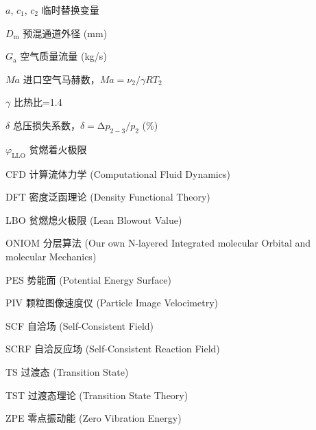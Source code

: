 
\begin{notation}
  \begin{notationlist}{2.8cm}
    \item[$a$, $c_1$, $c_2$] 临时替换变量
    \item[$D_{\text{m}}$] 预混通道外径 (mm)
    \item[$G_{\text{a}}$] 空气质量流量 (kg/s)
    \item[$\mathit{Ma}$] 进口空气马赫数，$\mathit{Ma} = \nu_2 / \gamma R T_2$
    \item[$\gamma$] 比热比=1.4
    \item[$\delta$] 总压损失系数，$\delta = \increment p_{2-3} / p_2$ (\%)
    \item[$\varphi_{\text{LLO}}$] 贫燃着火极限
    \item[CFD] 计算流体力学 (Computational Fluid Dynamics)
    \item[DFT] 密度泛函理论 (Density Functional Theory)
    \item[LBO] 贫燃熄火极限 (Lean Blowout Value)
    \item[ONIOM] 分层算法 (Our own N-layered Integrated molecular Orbital and molecular Mechanics)
    \item[PES] 势能面 (Potential Energy Surface)
    \item[PIV] 颗粒图像速度仪 (Particle Image Velocimetry)
    \item[SCF] 自洽场 (Self-Consistent Field)
    \item[SCRF] 自洽反应场 (Self-Consistent Reaction Field)
    \item[TS] 过渡态 (Transition State)
    \item[TST] 过渡态理论 (Transition State Theory)
    \item[ZPE] 零点振动能 (Zero Vibration Energy)
  \end{notationlist}
\end{notation}





